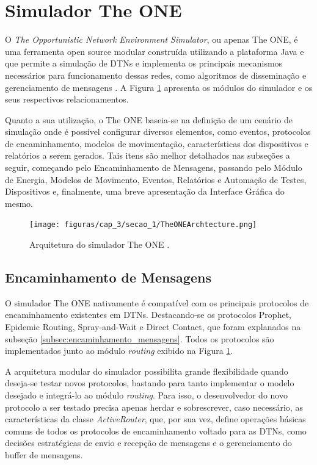 \section{Simulador The ONE}\label{sec:theONE}

O \emph{The Opportunistic Network Environment Simulator}, ou apenas The ONE, é uma ferramenta open source modular construída utilizando a plataforma Java e que permite a simulação de DTNs e implementa os principais mecanismos necessários para funcionamento dessas redes, como algoritmos de disseminação e gerenciamento de mensagens \cite{keranen2009one}. A Figura \ref{theONE} apresenta os módulos do simulador e os seus respectivos relacionamentos. 

Quanto a sua utilização, o The ONE baseia-se na definição de um cenário de simulação onde é possível configurar diversos elementos, como eventos, protocolos de encaminhamento, modelos de movimentação, características dos dispositivos e relatórios a serem gerados. Tais itens são melhor detalhados nas subseções a seguir, começando pelo Encaminhamento de Mensagens, passando pelo Módulo de Energia, Modelos de Movimento, Eventos, Relatórios e Automação de Testes, Dispositivos e, finalmente, uma breve apresentação da Interface Gráfica do mesmo.

\begin{figure}[htp!]
    \centering
    \texttt{[image: figuras/cap\_3/secao\_1/TheONEArchtecture.png]}
    \caption{Arquitetura do simulador The ONE \cite{keranen2009one}.}
    \label{theONE}
\end{figure}

\subsection{Encaminhamento de Mensagens}

O simulador The ONE nativamente é compatível com os principais protocolos de encaminhamento existentes em DTNs. Destacando-se os protocolos Prophet, Epidemic Routing, Spray-and-Wait e Direct Contact, que foram explanados na subseção \ref{subsec:encaminhamento_mensagens}. Todos os protocolos são implementados junto ao módulo \emph{routing} exibido na Figura \ref{theONE}.

A arquitetura modular do simulador possibilita grande flexibilidade quando deseja-se testar novos protocolos, bastando para tanto implementar o modelo desejado e integrá-lo ao módulo \emph{routing}. Para isso, o desenvolvedor do novo protocolo a ser testado precisa apenas herdar e sobrescrever, caso necessário, as características da classe \emph{ActiveRouter}, que, por sua vez, define operações básicas comuns de todos os protocolos de encaminhamento voltado para as DTNs, como decisões estratégicas de envio e recepção de mensagens e o gerenciamento do buffer de mensagens.

